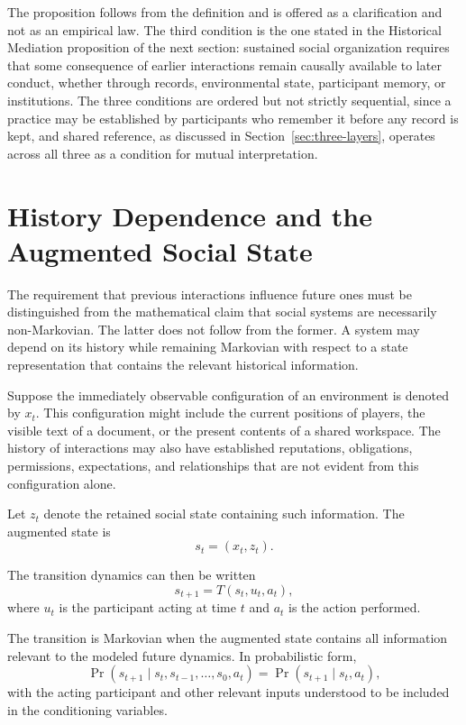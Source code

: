 \documentclass[11pt]{article}
\theoremstyle{remark}
\begin{document}
The proposition follows from the definition and is offered as a clarification and not as an empirical law. The third condition is the one stated in the Historical Mediation proposition of the next section: sustained social organization requires that some consequence of earlier interactions remain causally available to later conduct, whether through records, environmental state, participant memory, or institutions. The three conditions are ordered but not strictly sequential, since a practice may be established by participants who remember it before any record is kept, and shared reference, as discussed in Section~\ref{sec:three-layers}, operates across all three as a condition for mutual interpretation.

\section{History Dependence and the Augmented Social State}
\label{sec:augmented-social-state}

The requirement that previous interactions influence future
ones must be distinguished from the mathematical claim that
social systems are necessarily non-Markovian. The latter
does not follow from the former. A system may depend on its
history while remaining Markovian with respect to a state
representation that contains the relevant historical
information.

Suppose the immediately observable configuration of an
environment is denoted by $x_t$. This configuration might
include the current positions of players, the visible text
of a document, or the present contents of a shared workspace.
The history of interactions may also have established
reputations, obligations, permissions, expectations, and
relationships that are not evident from this configuration
alone.

Let $z_t$ denote the retained social state containing such
information. The augmented state is
\[
s_t=(x_t,z_t).
\]

The transition dynamics can then be written
\[
s_{t+1}=T(s_t,u_t,a_t),
\]
where $u_t$ is the participant acting at time $t$ and $a_t$
is the action performed.

The transition is Markovian when the augmented state
contains all information relevant to the modeled future
dynamics. In probabilistic form,
\[
\Pr(s_{t+1}\mid s_t,s_{t-1},\ldots,s_0,a_t)
=
\Pr(s_{t+1}\mid s_t,a_t),
\]
with the acting participant and other relevant inputs
understood to be included in the conditioning variables.
\end{document}
